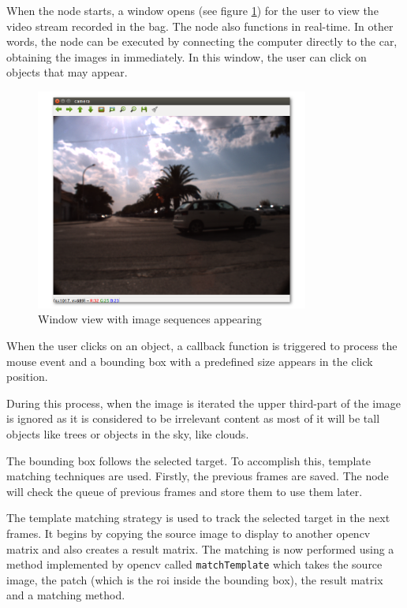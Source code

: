 When the node starts, a window opens (see figure \ref{fig:view}) for the user to view the video stream recorded in the bag. The node also functions in real-time. In other words, the node can be executed by connecting the computer directly to the car, obtaining the images in immediately. In this window, the user can click on objects that may appear. 


\begin{figure}[htp]
	
	\centering
	\includegraphics[width=0.8\textwidth]{caplabel/imgs/view.png}
	
	\caption{Window view with image sequences appearing}
	\label{fig:view}
	
\end{figure}

When the user clicks on an object, a callback function is triggered to process the mouse event and a bounding box with a predefined size appears in the click position.

During this process, when the image is iterated the upper third-part of the image is ignored as it is considered to be irrelevant content as most of it will be tall objects like trees or objects in the sky, like clouds.

The bounding box follows the selected target. To accomplish this, template matching techniques are used. Firstly, the previous frames are saved. The node will check the queue of previous frames and store them to use them later. 

The template matching strategy is used to track the selected target in the next frames. It begins by copying the source image to display to another \gls{opencv} matrix and also creates a result matrix. The matching is now performed using a method implemented by \gls{opencv} called \texttt{matchTemplate} which takes the source image, the patch (which is the \gls{roi} inside the bounding box), the result matrix and a matching method. 

